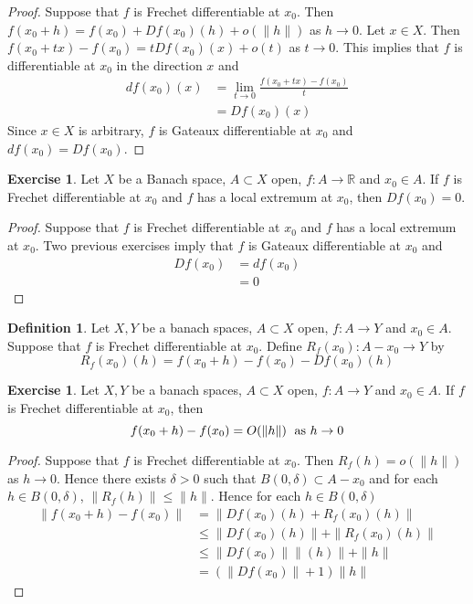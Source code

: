 \documentclass[12pt]{amsart}
\theoremstyle{definition}
\newtheorem{defn}[definition]{Definition}
\newtheorem{ex}[definition]{Exercise}
\newcommand{\del}{\delta}
\newcommand{\R}{\mathbb{R}}
\newcommand{\lex}[1]{\label{ex:#1}}
\newcommand{\ld}[1]{\label{defn:#1}}
\begin{document}
	\begin{proof}
	Suppose that $f$ is Frechet differentiable at $x_0$. Then $f(x_0 + h) = f(x_0) + Df(x_0)(h) + o(\|h\| )$ as $h \rightarrow 0$. Let $x \in X$. Then $f(x_0 + tx) - f(x_0) = tDf(x_0)(x) + o(t)$ as $t \rightarrow 0$. This implies that $f$ is differentiable at $x_0$ in the direction $x$ and 
	\begin{align*}
	df(x_0)(x) 
	&= \lim_{t \rightarrow 0} \frac{f(x_0 + tx) - f(x_0)}{t} \\
	&= Df(x_0)(x)
	\end{align*}
	Since $x \in X$ is arbitrary, $f$ is Gateaux differentiable at $x_0$ and $df(x_0) = Df(x_0)$.
	\end{proof}
	
	\begin{ex} \lex{62006}
	Let $X$ be a Banach space, $A \subset X$ open, $f:A \rightarrow \R$ and $x_0 \in A$. If $f$ is Frechet differentiable at $x_0$ and $f$ has a local extremum at $x_0$, then $Df(x_0) = 0$.
	\end{ex}	
	
	\begin{proof}
	Suppose that $f$ is Frechet differentiable at $x_0$ and $f$ has a local extremum at $x_0$. Two previous exercises imply that $f$ is Gateaux differentiable at $x_0$ and 
	\begin{align*}
	Df(x_0) 
	&= df(x_0) \\
	&= 0
	\end{align*}	
	\end{proof}
	
	\begin{defn} \ld{62007}
	Let $X, Y$ be a banach spaces, $A \subset X$ open, $f:A \rightarrow Y$ and $x_0 \in A$. Suppose that $f$ is Frechet differentiable at $x_0$. Define $R_f(x_0): A - x_0 \rightarrow Y$ by $$R_f(x_0)(h) = f(x_0 + h) - f(x_0) - Df(x_0)(h)$$
	\end{defn}
	
	\begin{ex} \lex{62008}
	Let $X, Y$ be a banach spaces, $A \subset X$ open, $f:A \rightarrow Y$ and $x_0 \in A$. If $f$ is Frechet differentiable at $x_0$, then $$f(x_0+h) - f(x_0) = O(\|h\|) \hspace{.1cm} \text{ as } h \rightarrow 0$$ 
	\end{ex}
	
	\begin{proof}
	Suppose that $f$ is Frechet differentiable at $x_0$. Then $R_f(h) = o(\|h\|)$ as $h \rightarrow 0$. Hence there exists $\del >0$ such that $B(0, \del) \subset A - x_0$ and for each $h \in B(0, \del)$, $\|R_f(h)\| \leq \|h\|$. Hence for each $h \in B(0, \del)$
	\begin{align*}
	\|f(x_0+h) - f(x_0) \| 
	&= \|Df(x_0)(h) + R_f(x_0)(h)\| \\
	& \leq \|Df(x_0)(h)\| + \|R_f(x_0)(h)\|  \\
	& \leq \|Df(x_0)\| \|(h)\| + \|h\| \\
	& = (\|Df(x_0)\| + 1) \|h\|
	\end{align*}
	\end{proof}
	
\end{document}
